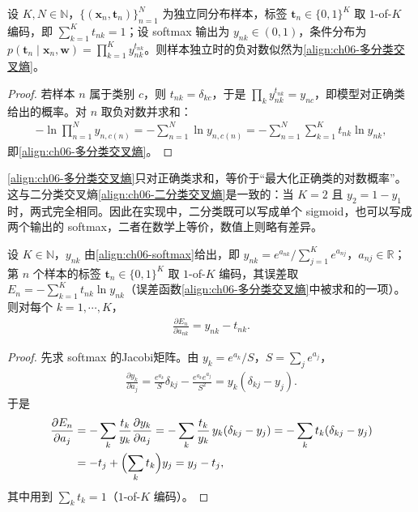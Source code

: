 \documentclass[../../main.tex]{subfiles}
\begin{document}
\begin{proposition}[多分类交叉熵是负对数似然]\label{proposition:ch06-多分类交叉熵}
设 $K,N\in\mathbb{N}$，$\{(\boldsymbol{x}_{n},\boldsymbol{t}_{n})\}_{n=1}^{N}$ 为独立同分布样本，标签 $\boldsymbol{t}_{n}\in\{0,1\}^{K}$ 取 $1$-of-$K$ 编码，即 $\sum_{k=1}^{K}t_{nk}=1$；设 softmax 输出为 $y_{nk}\in(0,1)$，条件分布为 $p(\boldsymbol{t}_{n}\mid\boldsymbol{x}_{n},\boldsymbol{w})=\prod_{k=1}^{K}y_{nk}^{t_{nk}}$。则样本独立时的负对数似然为\eqref{align:ch06-多分类交叉熵}。
\end{proposition}

\begin{proof}
若样本 $n$ 属于类别 $c$，则 $t_{nk}=\delta_{kc}$，于是 $\prod_k y_{nk}^{t_{nk}}=y_{nc}$，即模型对正确类给出的概率。对 $n$ 取负对数并求和：
\begin{align}
-\ln\prod_{n=1}^{N}y_{n,c(n)}=-\sum_{n=1}^{N}\ln y_{n,c(n)}=-\sum_{n=1}^{N}\sum_{k=1}^{K}t_{nk}\ln y_{nk},
\end{align}
即\eqref{align:ch06-多分类交叉熵}。
\end{proof}

\begin{remark}\eqref{align:ch06-多分类交叉熵}只对正确类求和，等价于“最大化正确类的对数概率”。这与二分类交叉熵\eqref{align:ch06-二分类交叉熵}是一致的：当 $K=2$ 且 $y_2=1-y_1$ 时，两式完全相同。因此在实现中，二分类既可以写成单个 sigmoid，也可以写成两个输出的 softmax，二者在数学上等价，数值上则略有差异。
\end{remark}

\begin{proposition}\label{proposition:ch06-softmax输出导数}
设 $K\in\mathbb{N}$，$y_{nk}$ 由\eqref{align:ch06-softmax}给出，即 $y_{nk}=e^{a_{nk}}\big/\sum_{j=1}^{K}e^{a_{nj}}$，$a_{nj}\in\mathbb{R}$；第 $n$ 个样本的标签 $\boldsymbol{t}_{n}\in\{0,1\}^{K}$ 取 $1$-of-$K$ 编码，其误差取 $E_{n}=-\sum_{k=1}^{K}t_{nk}\ln y_{nk}$（误差函数\eqref{align:ch06-多分类交叉熵}中被求和的一项）。则对每个 $k=1,\cdots,K$，
\begin{align}
\frac{\partial E_n}{\partial a_{nk}}=y_{nk}-t_{nk} .
\label{align:ch06-softmax输出导数}
\end{align}
\end{proposition}

\begin{proof}
先求 softmax 的Jacobi矩阵。由 $y_k=e^{a_k}/S$，$S=\sum_j e^{a_j}$，
\begin{align}
\frac{\partial y_k}{\partial a_j}=\frac{e^{a_k}}{S}\delta_{kj}-\frac{e^{a_k}e^{a_j}}{S^{2}}=y_k(\delta_{kj}-y_j).
\end{align}
于是
\begin{align}
\frac{\partial E_n}{\partial a_j}
&=-\sum_{k}\frac{t_k}{y_k}\frac{\partial y_k}{\partial a_j}
=-\sum_{k}\frac{t_k}{y_k}\,y_k(\delta_{kj}-y_j)
=-\sum_{k}t_k(\delta_{kj}-y_j)\nonumber\\
&=-t_j+\Bigl(\sum_{k}t_k\Bigr)y_j=y_j-t_j,
\end{align}
其中用到 $\sum_kt_k=1$（$1$-of-$K$ 编码）。
\end{proof}
\end{document}

